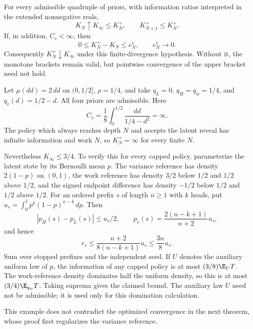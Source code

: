 \begin{theorem}\label{thm:genie-ratio}
For every admissible quadruple of priors, with information ratios
interpreted in the extended nonnegative reals,
\begin{equation}\label{eq:genie-bracket}
 K_N\uparrow K_\infty\le K_N^+,
 \qquad K_{N+1}^+\le K_N^+.
\end{equation}
If, in addition, $C_v<\infty$, then
\begin{equation}\label{eq:genie-error}
 0\le K_N^+-K_N\le e_N^v,\qquad e_N^v\longrightarrow0.
\end{equation}
Consequently $K_N^+\downarrow K_\infty$ under this finite-divergence
hypothesis. Without it, the monotone brackets remain valid, but
pointwise convergence of the upper bracket need not hold.
\end{theorem}

\begin{remark}
Let $\mu(dd)=2\,dd$ on $(0,1/2]$, $\rho=1/4$, and take
$q_L=0$, $q_H=q_w=1/4$, and $q_v(d)=1/2-d$. All four priors are
admissible. Here
\[
 C_v=\frac18\int_0^{1/2}\frac{dd}{1/4-d^2}=\infty.
\]
The policy which always reaches depth $N$ and accepts the latent reveal
has infinite information and work $N$, so $K_N^+=\infty$ for every
finite $N$.

Nevertheless $K_\infty\le3/4$. To verify this for every capped policy,
parameterize the latent state by its Bernoulli mean $p$. The variance
reference has density $2(1-p)$ on $(0,1)$, the work reference has density
$3/2$ below $1/2$ and $1/2$ above $1/2$, and the signed endpoint
difference has density $-1/2$ below $1/2$ and $1/2$ above $1/2$.
For an ordered prefix $s$ of length $n\ge1$ with $k$ heads, put
$u_s=\int_0^1p^k(1-p)^{n-k}\,dp$. Then
\[
 |p_H(s)-p_L(s)|\le u_s/2,\qquad
 p_v(s)=\frac{2(n-k+1)}{n+2}u_s,
\]
and hence
\[
 r_s\le\frac{n+2}{8(n-k+1)}u_s\le\frac{3n}{8}u_s.
\]
Sum over stopped prefixes and the independent seed. If $U$ denotes the
auxiliary uniform law of $p$, the information of any capped policy is
at most $(3/8)\E_U T$. The work-reference density dominates half the
uniform density, so this is at most $(3/4)\E_{q_w}T$. Taking suprema
gives the claimed bound. The auxiliary law $U$ need not be admissible;
it is used only for this domination calculation.

This example does not contradict the optimized convergence in the next
theorem, whose proof first regularizes the variance reference.
\end{remark}

